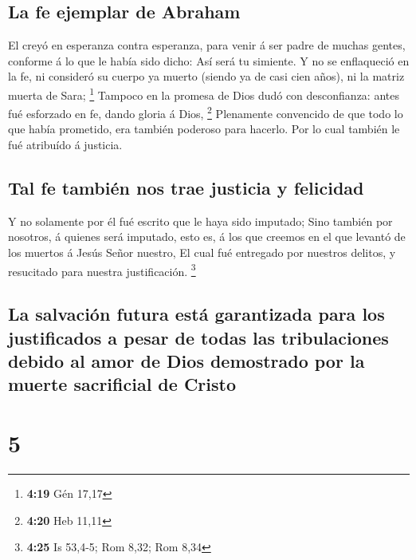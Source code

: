 \hypertarget{la-fe-ejemplar-de-abraham}{%
\subsection{La fe ejemplar de Abraham}\label{la-fe-ejemplar-de-abraham}}

 El creyó en esperanza contra esperanza, para venir á ser
padre de muchas gentes, conforme á lo que le había sido dicho: Así será
tu simiente.  Y no se enflaqueció en la fe, ni consideró su
cuerpo ya muerto (siendo ya de casi cien años), ni la matriz muerta de
Sara; \footnote{\textbf{4:19} Gén 17,17}  Tampoco en la
promesa de Dios dudó con desconfianza: antes fué esforzado en fe, dando
gloria á Dios, \footnote{\textbf{4:20} Heb 11,11} 
Plenamente convencido de que todo lo que había prometido, era también
poderoso para hacerlo.  Por lo cual también le fué
atribuído á justicia.

\hypertarget{tal-fe-tambiuxe9n-nos-trae-justicia-y-felicidad}{%
\subsection{Tal fe también nos trae justicia y
felicidad}\label{tal-fe-tambiuxe9n-nos-trae-justicia-y-felicidad}}

 Y no solamente por él fué escrito que le haya sido
imputado;  Sino también por nosotros, á quienes será
imputado, esto es, á los que creemos en el que levantó de los muertos á
Jesús Señor nuestro,  El cual fué entregado por nuestros
delitos, y resucitado para nuestra justificación. \footnote{\textbf{4:25}
  Is 53,4-5; Rom 8,32; Rom 8,34}

\hypertarget{la-salvaciuxf3n-futura-estuxe1-garantizada-para-los-justificados-a-pesar-de-todas-las-tribulaciones-debido-al-amor-de-dios-demostrado-por-la-muerte-sacrificial-de-cristo}{%
\subsection{La salvación futura está garantizada para los justificados a
pesar de todas las tribulaciones debido al amor de Dios demostrado por
la muerte sacrificial de
Cristo}\label{la-salvaciuxf3n-futura-estuxe1-garantizada-para-los-justificados-a-pesar-de-todas-las-tribulaciones-debido-al-amor-de-dios-demostrado-por-la-muerte-sacrificial-de-cristo}}

\hypertarget{section-4}{%
\section{5}\label{section-4}}


